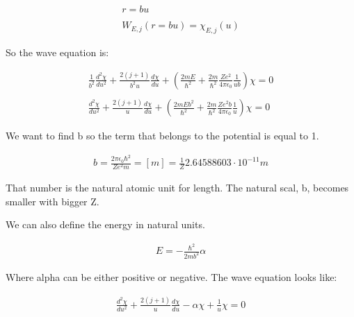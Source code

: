 \begin{equation}
  \begin{array}{c}
    r = b u
    \\

    \\
    W_{E,j}(r=bu) = \chi_{E,j}(u)
  \end{array}
\end{equation}

So the wave equation is:

\begin{equation}
  \begin{array}{c}
  \frac{1}{b^2} \frac{d^2\chi}{du^2} + \frac{2(j+1)}{b^2 u}\frac{d \chi}{du} + \left(\frac{2mE}{\hbar^2} + \frac{2m}{\hbar^2}\frac{Ze^2}{4\pi\epsilon_0}\frac{1}{ub}\right)\chi = 0
  \\

  \\
  \frac{d^2\chi}{du^2} + \frac{2(j+1)}{u} \frac{d\chi}{du} + \left(\frac{2mEb^2}{\hbar^2}+\frac{2m}{\hbar^2}\frac{Ze^2 b}{4\pi\epsilon_0}\frac{1}{u}\right)\chi = 0
  \end{array}
\end{equation}

We want to find b so the term that belongs to the potential is equal to 1.

\begin{equation}
  \begin{array}{c}
    b = \frac{2\pi \epsilon_0 \hbar^2}{Z e^2 m} = [m] = \frac{1}{Z} 2.64588603 \cdot 10^{-11} m
  \end{array}
\end{equation}

That number is the natural atomic unit for length. The natural scal, b, becomes smaller with bigger Z.

We can also define the energy in natural units.

\begin{equation}
  \begin{array}{c}
    E = -\frac{\hbar^2}{2mb^2}\alpha
  \end{array}
\end{equation}

Where alpha can be either positive or negative. The wave equation looks like:

\begin{equation}
  \begin{array}{c}
    \frac{d^2\chi}{du^2} + \frac{2(j+1)}{u}\frac{d\chi}{du}-\alpha\chi +\frac{1}{u}\chi= 0
  \end{array}
\end{equation}

